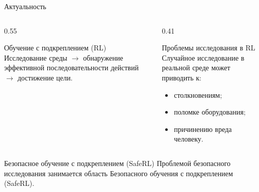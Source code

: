 \begin{frame}[shrink=15]{Актуальность}
\begin{columns}[T,onlytextwidth]
\begin{column}{0.55\textwidth}
\begin{block}{Обучение с подкреплением (RL)}
                \centering
                Исследование среды \(\rightarrow\) обнаружение эффективной
                последовательности действий \(\rightarrow\) достижение цели.
            \end{block}
        \end{column}
        \begin{column}{0.41\textwidth}
            \begin{alertblock}{Проблемы исследования в RL}
                Случайное исследование в реальной среде может приводить к:
                \begin{itemize}
                    \item столкновениям;
                    \item поломке оборудования;
                    \item причинению вреда человеку.
                \end{itemize}
            \end{alertblock}
        \end{column}
    \end{columns}
    \vspace{0.3em}
    \begin{block}{Безопасное обучение с подкреплением (SafeRL)}
        Проблемой безопасного исследования занимается область Безопасного
        обучения с подкреплением (SafeRL).
    \end{block}
\end{frame}

